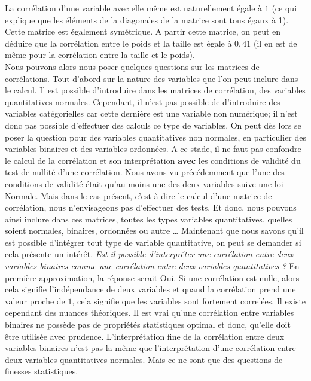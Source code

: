 La corrélation d'une variable avec elle même est naturellement égale à $1$ (ce qui explique que les éléments de la diagonales de la matrice sont tous égaux à 1). Cette matrice est également symétrique. \newline
A partir cette matrice, on peut en déduire que la corrélation entre le poids et la taille est égale à $0,41$ (il en est de même pour la corrélation entre la taille et le poids).\newline
\\
Nous pouvons alors nous poser quelques questions sur les matrices de corrélations. \newline
Tout d'abord sur la nature des variables que l'on peut inclure dans le calcul. Il est possible d'introduire dans les matrices de corrélation, des variables quantitatives normales. Cependant, il n'est pas possible de d'introduire des variables catégorielles car cette dernière est une variable non numérique; il n'est donc pas possible d'effectuer des calculs ce type de variables. \newline
On peut dès lors se poser la question pour des variables quantitatives non normales, en particulier des variables binaires et des variables ordonnées. A ce stade, il ne faut pas confondre le calcul de la corrélation et son interprétation \textbf{avec} les conditions de validité du test de nullité d'une corrélation. Nous avons vu précédemment que l'une des conditions de validité était qu'au moins une des deux variables suive une loi Normale. Mais dans le cas présent, c'est à dire le calcul d'une matrice de corrélation, nous n'envisageons pas d'effectuer des tests. Et donc, nous pouvons ainsi inclure dans ces matrices, toutes les types variables quantitatives, quelles soient normales, binaires, ordonnées ou autre \dots\newline
Maintenant que nous savons qu'il est possible d'intégrer tout type de variable quantitative, on peut se demander si cela présente un intérêt. \textit{Est il possible d'interpréter une corrélation entre deux variables binaires comme une corrélation entre deux variables quantitatives ?} En première approximation, la réponse serait Oui. Si une corrélation est nulle, alors cela signifie l'indépendance de deux variables et quand la corrélation prend une valeur proche de $1$, cela signifie que les variables sont fortement correlées.\newline
Il existe cependant des nuances théoriques. Il est vrai qu'une corrélation entre variables binaires ne possède pas de propriétés statistiques optimal et donc, qu'elle doit être utilisée avec prudence. L'interprétation fine de la corrélation entre deux variables binaires n'est pas la même que l'interprétation d'une corrélation entre deux variables quantitatives normales. Mais ce ne sont que des questions de finesses statistiques.\newline
